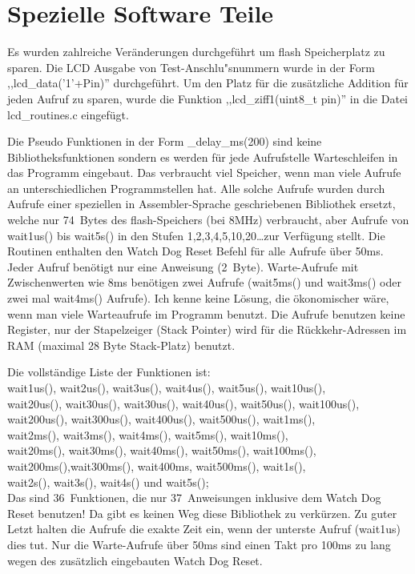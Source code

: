 
\chapter{Spezielle Software Teile}

Es wurden zahlreiche Ver\"anderungen durchgef\"uhrt um flash Speicherplatz zu sparen.
Die LCD Ausgabe von Test-Anschlu"snummern wurde in der Form ,,lcd\_data('1'+Pin)'' durchgef\"uhrt.
Um den Platz f\"ur die zus\"atzliche Addition f\"ur jeden Aufruf zu sparen, wurde die
Funktion ,,lcd\_ziff1(uint8\_t pin)'' in die Datei lcd\_routines.c eingef\"ugt.


Die Pseudo Funktionen in der Form \_delay\_ms(200) sind keine Bibliotheksfunktionen
sondern es werden f\"ur jede Aufrufstelle Warteschleifen in das Programm eingebaut.
Das verbraucht viel Speicher, wenn man viele Aufrufe an unterschiedlichen Programmstellen hat.
Alle solche Aufrufe wurden durch Aufrufe einer speziellen in Assembler-Sprache geschriebenen
Bibliothek ersetzt, welche nur 74~Bytes des flash-Speichers (bei 8MHz) verbraucht, aber
Aufrufe von wait1us() bis wait5s() in den Stufen 1,2,3,4,5,10,20\dots zur Verf\"ugung stellt.
Die Routinen enthalten den Watch Dog Reset Befehl f\"ur alle Aufrufe \"uber 50ms.
Jeder Aufruf ben\"otigt nur eine Anweisung (2~Byte). Warte-Aufrufe mit Zwischenwerten
wie 8ms ben\"otigen zwei Aufrufe (wait5ms() und wait3ms() oder zwei mal wait4ms() Aufrufe).
Ich kenne keine L\"osung, die \"okonomischer w\"are, wenn man viele Warteaufrufe im Programm benutzt.
Die Aufrufe benutzen keine Register, nur der Stapelzeiger (Stack Pointer) wird f\"ur die R\"uckkehr-Adressen
im RAM (maximal 28 Byte Stack-Platz) benutzt.

Die vollst\"andige Liste der Funktionen ist:\\
wait1us(), wait2us(), wait3us(), wait4us(), wait5us(), wait10us(), \\
wait20us(), wait30us(), wait30us(), wait40us(), wait50us(), wait100us(), \\
wait200us(), wait300us(), wait400us(), wait500us(), wait1ms(),\\
wait2ms(), wait3ms(), wait4ms(), wait5ms(), wait10ms(),\\
wait20ms(), wait30ms(), wait40ms(), wait50ms(), wait100ms(),\\
wait200ms(),wait300ms(), wait400ms, wait500ms(), wait1s(),\\
wait2s(), wait3s(), wait4s() und wait5s();\\
Das sind 36~Funktionen, die nur 37~Anweisungen inklusive dem Watch Dog Reset benutzen!
Da gibt es keinen Weg diese Bibliothek zu verk\"urzen.
Zu guter Letzt halten die Aufrufe die exakte Zeit ein, wenn der unterste Aufruf (wait1us) dies tut.
Nur die Warte-Aufrufe \"uber 50ms sind einen Takt pro 100ms zu lang wegen des zus\"atzlich eingebauten
Watch Dog Reset.



